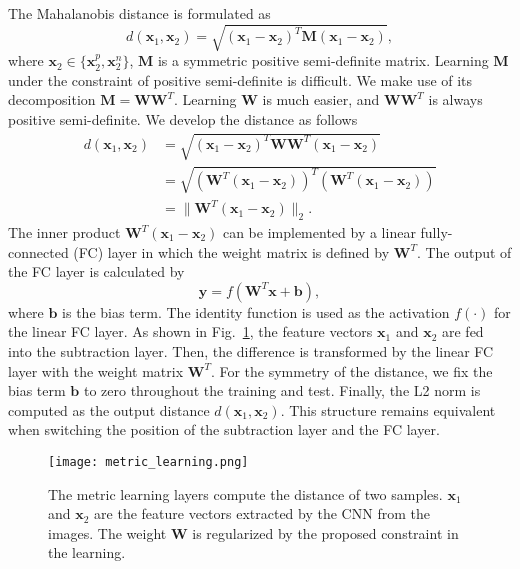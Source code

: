 \documentclass[runningheads]{llncs}
\begin{document}
The Mahalanobis distance is formulated as
\begin{equation}\label{M-dist}
    d(\mathbf{x}_1, \mathbf{x}_2) = \sqrt{ (\mathbf{x}_1 - \mathbf{x}_2)^T \textbf{M} (\mathbf{x}_1 - \mathbf{x}_2) },
\end{equation}
where $\mathbf{x}_2 \in \{\mathbf{x}_2^p,\mathbf{x}_2^n\}$, $\textbf{M}$ is a symmetric positive semi-definite matrix.
Learning $\textbf{M}$ under the constraint of positive semi-definite is difficult. We make use of its decomposition $\textbf{M} = \textbf{W}\textbf{W}^T$. Learning $\textbf{W}$ is much easier, and $\textbf{W}\textbf{W}^T$ is always positive semi-definite.
We develop the distance as follows
\begin{align}\label{M-dist-dev-2}
    d(\mathbf{x}_1, \mathbf{x}_2)  & = \sqrt{ (\mathbf{x}_1 - \mathbf{x}_2)^T \textbf{W}\textbf{W}^T (\mathbf{x}_1 - \mathbf{x}_2) }    \nonumber   \\
    & = \sqrt{ (\textbf{W}^T(\mathbf{x}_1 - \mathbf{x}_2))^T(\textbf{W}^T(\mathbf{x}_1 - \mathbf{x}_2)) }            \nonumber   \\
    & = \|\textbf{W}^T(\mathbf{x}_1 - \mathbf{x}_2)\|_2.
\end{align}
The inner product $\textbf{W}^T(\mathbf{x}_1 - \mathbf{x}_2)$ can be implemented by a linear fully-connected (FC) layer in which the weight matrix is defined by $\textbf{W}^T$.
The output of the FC layer is calculated by
\begin{equation}\label{FC_compute}
    \mathbf{y} = f(\textbf{W}^T\mathbf{x} + \mathbf{b}),
\end{equation}
where $\mathbf{b}$ is the bias term.
The identity function is used as the activation $f(\cdot)$ for the linear FC layer.
As shown in Fig.~\ref{fig_metric_learning}, the feature vectors $\mathbf{x}_1$ and $\mathbf{x}_2$ are fed into the subtraction layer.
Then, the difference is transformed by the linear FC layer with the weight matrix $\textbf{W}^T$.
For the symmetry of the distance, we fix the bias term $\mathbf{b}$ to zero throughout the training and test.
Finally, the L2 norm is computed as the output distance $d(\mathbf{x}_1, \mathbf{x}_2)$.
This structure remains equivalent when switching the position of the subtraction layer and the FC layer.

\begin{figure}[!htb]
  \centering
  \texttt{[image: metric\_learning.png]}
  \caption{The metric learning layers compute the distance of two samples. $\mathbf{x}_1$ and $\mathbf{x}_2$ are the feature vectors extracted by the CNN from the images. The weight $\textbf{W}$ is regularized by the proposed constraint in the learning.}
  \label{fig_metric_learning}
\end{figure}
\end{document}
